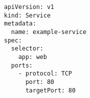 \begin{verbatim}
apiVersion: v1
kind: Service
metadata:
  name: example-service
spec:
  selector:
    app: web
  ports:
    - protocol: TCP
      port: 80
      targetPort: 80
\end{verbatim}